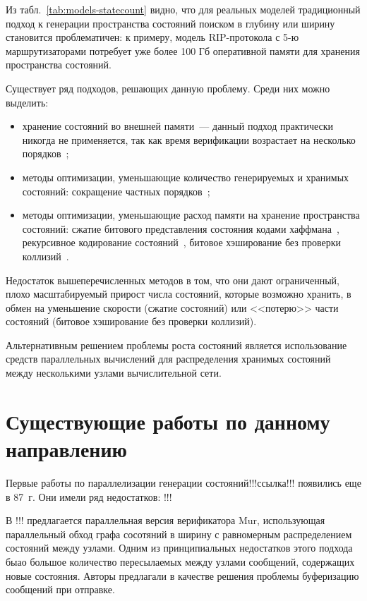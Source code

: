 \documentclass[a4paper,notitlepage,14pt]{article}
\begin{document}
Из табл.~\ref{tab:models-statecount} видно, что для реальных моделей традиционный подход к
генерации пространства состояний поиском в глубину или ширину становится проблематичен: к
примеру, модель RIP-протокола с 5-ю маршрутизаторами потребует уже более 100 Гб
оперативной памяти для хранения пространства состояний.

Существует ряд подходов, решающих данную проблему. Среди них можно выделить:

\begin{itemize}
\item хранение состояний во внешней памяти~--- данный подход практически никогда не
  применяется, так как время верификации возрастает на несколько порядков~\cite{Clarke};
\item методы оптимизации, уменьшающие количество генерируемых и хранимых состояний:
  сокращение частных порядков~\cite{POD};
\item методы оптимизации, уменьшающие расход памяти на хранение пространства состояний:
  сжатие битового представления состояния кодами хаффмана~\cite{StateCompr}, рекурсивное
  кодирование состояний~\cite{StateCompr}, битовое хэширование без проверки
  коллизий~\cite{BitHash1,Wolper}.
\end{itemize}

Недостаток вышеперечисленных методов в том, что они дают ограниченный, плохо
масштабируемый прирост числа состояний, которые возможно хранить, в обмен на уменьшение
скорости (сжатие состояний) или <<потерю>> части состояний (битовое хэширование без
проверки коллизий).

Альтернативным решением проблемы роста состояний является использование средств
параллельных вычислений для распределения хранимых состояний между несколькими узлами
вычислительной сети.

\section{Существующие работы по данному направлению}
\label{sec:other-work}

Первые работы по параллелизации генерации состояний!!!ссылка!!! появились еще в 87~г. Они
имели ряд недостатков: !!!

В !!! предлагается параллельная версия верификатора Mur\phi, использующая параллельный
обход графа сосотяний в ширину с равномерным распределением состояний между узлами. Одним
из принципиальных недостатков этого подхода быао большое количество пересылаемых между
узлами сообщений, содержащих новые состояния. Авторы предлагали в качестве решения
проблемы буферизацию сообщений при отправке.
\end{document}

